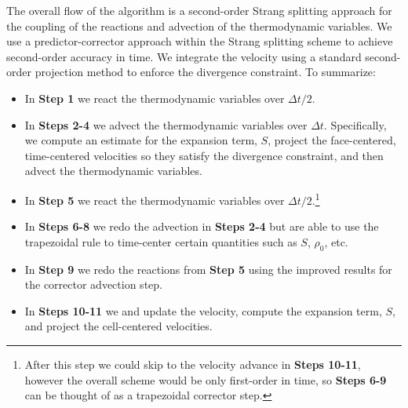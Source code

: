 The overall flow of the algorithm is a second-order Strang splitting approach for the coupling of the reactions and advection of the thermodynamic variables.  
We use a predictor-corrector approach within the Strang splitting scheme to achieve second-order accuracy in time.
We integrate the velocity using a standard second-order projection method to enforce the divergence constraint.
To summarize:
\begin{itemize}
\item In {\bf Step 1} we react the thermodynamic variables over $\Delta t/2$.
\item In {\bf Steps 2-4} we advect the thermodynamic variables over $\Delta t$.  Specifically, we compute an estimate for the expansion term, $S$, project the face-centered, time-centered velocities so they satisfy the divergence constraint, and then advect the thermodynamic variables.
\item In {\bf Step 5} we react the thermodynamic variables over $\Delta t/2$.\footnote{After this step we could skip to the velocity advance in {\bf Steps 10-11}, however the overall scheme would be only first-order in time, so {\bf Steps 6-9} can be thought of as a trapezoidal corrector step.}
\item In {\bf Steps 6-8} we redo the advection in {\bf Steps 2-4} but are able to use the trapezoidal rule to time-center certain quantities such as $S$, $\rho_0$, etc.
\item In {\bf Step 9} we redo the reactions from {\bf Step 5} using the improved results for the corrector advection step.
\item In {\bf Steps 10-11} we and update the velocity, compute the expansion term, $S$, and project the cell-centered velocities.
\end{itemize}


